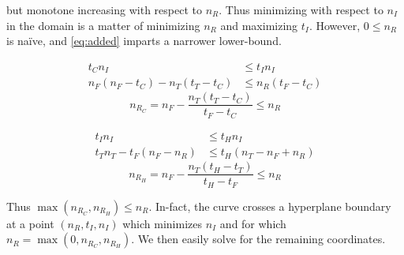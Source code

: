 \documentclass{article}
\newcommand{\tightmathT}{%
    \setlength{\abovedisplayskip}{0pt}
    \setlength{\abovedisplayshortskip}{0pt}
}
\newcommand{\tightmathB}{%
    \setlength{\belowdisplayskip}{0pt}
    \setlength{\belowdisplayshortskip}{0pt}
}
\newcommand{\tightmath}{%
    \tightmathT%
    \tightmathB%
}
\begin{document}
but monotone increasing with respect to $n_R$.
Thus minimizing with respect to $n_I$ in the domain is
a matter of minimizing $n_R$ and maximizing $t_I$.
However, $0\le n_R$ is naïve, and \autoref{eq:added}
imparts a narrower lower-bound.
\begin{multicols}{2}
    \raggedcolumns
    \tightmath
    \begin{align*}
        t_C n_I &\le t_I n_I \\
        n_F(n_F-t_C)-n_T(t_T-t_C) &\le n_R(t_F-t_C)
    \end{align*}
    \begin{equation}\label{eq:nRC}
        n_{R_C} = n_F-\frac{n_T(t_T-t_C)}{t_F-t_C} \le n_R
    \end{equation}
    \columnbreak

    \begin{align*}
        t_I n_I &\le t_H n_I \\
        t_Tn_T-t_F(n_F-n_R) &\le t_H(n_T-n_F+n_R)
    \end{align*}
    \begin{equation}\label{eq:nRH}
        n_{R_H} = n_F-\frac{n_T(t_H-t_T)}{t_H-t_F} \le n_R
    \end{equation}
\end{multicols}
\noindent
Thus $\max(n_{R_C},n_{R_H}) \le n_R$.
In-fact, the curve crosses a hyperplane boundary at a point $(n_R,t_I,n_I)$
which minimizes $n_I$ and for which $n_R=\max(0, n_{R_C}, n_{R_H})$.
We then easily solve for the remaining coordinates.
\end{document}
